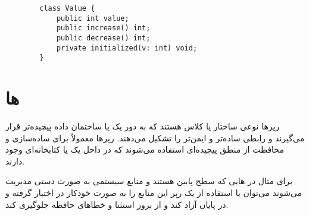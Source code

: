 \documentclass[a4paper]{article}
\begin{document}
\begin{LTR}
    \begin{lstlisting}
        class Value {
            public int value;
            public increase() int;
            public decrease() int;
            private initialized(v: int) void;
        }
      \end{lstlisting}
\end{LTR}

\section{ها}

رپر‌ها نوعی ساختار یا کلاس هستند که به دور یک  یا ساختمان داده پیچیده‌تر
قرار می‌گیرند و رابطی ساده‌تر و ایمن‌تر را تشکیل می‌دهند. رپر‌ها معمولاً برای
ساده‌سازی و محافظت از منطق پیچیده‌ای استفاده می‌شوند که در داخل یک  یا
کتابخانه‌ای وجود دارند.

برای مثال در هایی که سطح پایین هستند و منابع سیستمی به صورت دستی مدیریت
می‌شوند می‌توان با استفاده از یک رپر این منابع را به صورت خودکار در اختیار گرفته
و در پایان آزاد کند و از بروز استثنا و خطا‌های حافظه جلوگیری کند.

% 
% 
\end{document}
